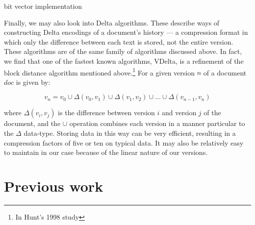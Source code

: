 \documentclass[a4paper,11pt,twoside,notitlepage]{article}
\begin{document}
        bit vector implementation\cite{Hyyro2003}

        Finally, we may also look into Delta algorithms. These
        describe ways of constructing Delta encodings of a document's
        history --- a compression format in which only the difference
        between each text is stored, not the entire version. These
        algorithms are of the same family of algorithms discussed
        above. In fact, we find that one of the fastest known
        algorithms, VDelta, is a refinement of the block distance
        algorithm mentioned above.\footnote{In Hunt's 1998
          study\cite{Hunt1998}} For a given version $n$ of a document
        $doc$ is given by:
        
        $$v_n = v_0 \cup {\Delta}(v_0,v_1) \cup {\Delta}(v_1,v_2)
        \cup \dots \cup {\Delta}(v_{n-1},v_n) $$

        where ${\Delta}(v_i,v_j)$ is the difference between version
        $i$ and version $j$ of the document, and the $\cup$ operation
        combines each version in a manner particular to the $\Delta$
        data-type. Storing data in this way can be very efficient,
        resulting in a compression factors of five or ten on typical
        data.\cite{Macdonald2000} It may also be relatively easy to
        maintain in our case because of the linear nature of our
        versions.  

        



 
        \section{Previous work}
\end{document}
